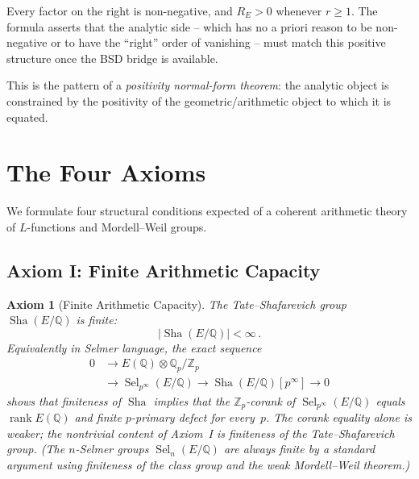 \documentclass[aps,prd,twocolumn,superscriptaddress,nofootinbib,floatfix]{revtex4-2}
\newtheorem{axiom}[theorem]{Axiom}
\theoremstyle{definition}
\theoremstyle{remark}
\DeclareMathOperator{\rank}{rank}
\DeclareMathOperator{\Sel}{Sel}
\DeclareMathOperator{\Sha}{Sha}
\begin{document}
Every factor on the right is non-negative, and $R_E > 0$ whenever $r \geq 1$. The formula asserts that the analytic side -- which has no a priori reason to be non-negative or to have the ``right'' order of vanishing -- must match this positive structure once the BSD bridge is available.

This is the pattern of a \textit{positivity normal-form theorem}: the analytic object is constrained by the positivity of the geometric/arithmetic object to which it is equated.


\clearpage
\section{The Four Axioms}
\label{sec:axioms}

We formulate four structural conditions expected of a coherent arithmetic theory of $L$-functions and Mordell--Weil groups.

\subsection{Axiom I: Finite Arithmetic Capacity}

\begin{axiom}[Finite Arithmetic Capacity]
\label{ax:finite}
The Tate--Shafarevich group $\Sha(E/\mathbb{Q})$ is finite:
\begin{equation}
|\Sha(E/\mathbb{Q})| < \infty\,.
\end{equation}
Equivalently in Selmer language, the exact sequence
\[
\begin{aligned}
0 &\longrightarrow E(\mathbb{Q})\otimes \mathbb{Q}_p/\mathbb{Z}_p \\
  &\longrightarrow \Sel_{p^\infty}(E/\mathbb{Q})
  \longrightarrow \Sha(E/\mathbb{Q})[p^\infty]
  \longrightarrow 0
\end{aligned}
\]
shows that finiteness of $\Sha$ implies that the $\mathbb{Z}_p$-corank of $\Sel_{p^\infty}(E/\mathbb{Q})$ equals $\rank E(\mathbb{Q})$
and finite $p$-primary defect for every~$p$. The corank equality alone is weaker;
the nontrivial content of Axiom~I is finiteness of the Tate--Shafarevich group.
(The $n$-Selmer groups $\Sel_n(E/\mathbb{Q})$ are always finite by a standard
argument using finiteness of the class group and the weak Mordell--Weil theorem.)
\end{axiom}
\end{document}
